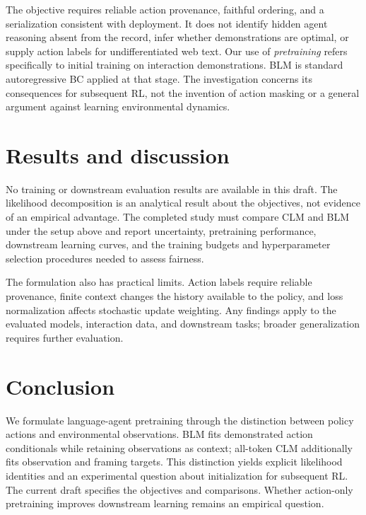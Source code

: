\documentclass{article} %
\begin{document}
The objective requires reliable action provenance, faithful ordering, and a serialization consistent with deployment. It does not identify hidden agent reasoning absent from the record, infer whether demonstrations are optimal, or supply action labels for undifferentiated web text. Our use of \emph{pretraining} refers specifically to initial training on interaction demonstrations. BLM is standard autoregressive BC applied at that stage. The investigation concerns its consequences for subsequent RL, not the invention of action masking or a general argument against learning environmental dynamics.

\section{Results and discussion}
\label{sec:results}
No training or downstream evaluation results are available in this draft. The likelihood decomposition is an analytical result about the objectives, not evidence of an empirical advantage. The completed study must compare CLM and BLM under the setup above and report uncertainty, pretraining performance, downstream learning curves, and the training budgets and hyperparameter selection procedures needed to assess fairness.

The formulation also has practical limits. Action labels require reliable provenance, finite context changes the history available to the policy, and loss normalization affects stochastic update weighting. Any findings apply to the evaluated models, interaction data, and downstream tasks; broader generalization requires further evaluation.

\section{Conclusion}
We formulate language-agent pretraining through the distinction between policy actions and environmental observations. BLM fits demonstrated action conditionals while retaining observations as context; all-token CLM additionally fits observation and framing targets. This distinction yields explicit likelihood identities and an experimental question about initialization for subsequent RL. The current draft specifies the objectives and comparisons. Whether action-only pretraining improves downstream learning remains an empirical question.



\end{document}
